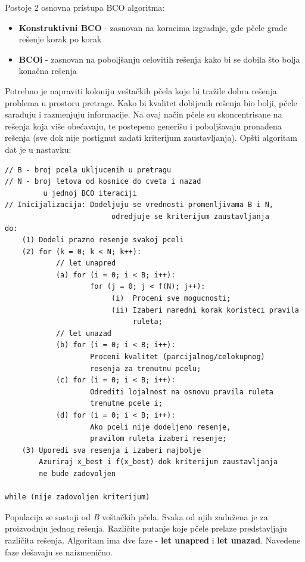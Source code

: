 \documentclass[a4paper]{article}
\begin{document}
{Postoje 2 osnovna pristupa BCO algoritma:
\begin{itemize}%
\setlength{\labelsep}{10pt}
	\item \textbf{Konstruktivni BCO} - zasnovan na koracima izgradnje, gde pčele grade rešenje korak po korak
	\item \textbf{BCOi} - zasnovan na poboljšanju celovitih rešenja kako bi se dobila što bolja konačna rešenja \cite{bcoalg}
\end{itemize}

Potrebno je napraviti koloniju veštačkih pčela koje bi tražile dobra rešenja problema u prostoru pretrage. Kako bi kvalitet dobijenih rešenja bio bolji, pčele sarađuju i razmenjuju informacije. Na ovaj način pčele su skoncentrisane na rešenja koja više obećavaju, te postepeno generišu i poboljšavaju pronađena rešenja (sve dok nije postignut zadati kriterijum zaustavljanja).
Opšti algoritam dat je u nastavku:

\begin{lstlisting}[caption={Pseudokod {\em BCO} algoritma \cite{algoritam} },frame=single, label=simple]
// B - broj pcela ukljucenih u pretragu
// N - broj letova od kosnice do cveta i nazad 
	     u jednoj BCO iteraciji
// Inicijalizacija: Dodeljuju se vrednosti promenljivama B i N, 
		 		         odredjuje se kriterijum zaustavljanja
do:
    (1) Dodeli prazno resenje svakoj pceli
    (2) for (k = 0; k < N; k++):
    		// let unapred
    		(a) for (i = 0; i < B; i++):
    			    for (j = 0; j < f(N); j++):
    					 (i)  Proceni sve mogucnosti;
    					 (ii) Izaberi naredni korak koristeci pravila 
    					      ruleta;
    		// let unazad
    		(b) for (i = 0; i < B; i++):
    			    Proceni kvalitet (parcijalnog/celokupnog) 
    			    resenja	za trenutnu pcelu;
    		(c) for (i = 0; i < B; i++):  
    		    	Odrediti lojalnost na osnovu pravila ruleta
    		    	trenutne pcele i;
		    (d) for (i = 0; i < B; i++):
		       		Ako pceli nije dodeljeno resenje, 
		       		pravilom ruleta izaberi resenje;
    (3) Uporedi sva resenja i izaberi najbolje
        Azuriraj x_best i f(x_best) dok kriterijum zaustavljanja
        ne bude zadovoljen
    
while (nije zadovoljen kriterijum)
\end{lstlisting}

Populacija se sastoji od {\em B} veštačkih pčela. Svaka od njih zadužena je za proizvodnju jednog rešenja. Različite putanje koje pčele prelaze predstavljaju različita rešenja. Algoritam ima dve faze - \textbf{let unapred} i \textbf{let unazad}. Navedene faze dešavaju se naizmenično\cite{algoritam}.

}
\end{document}
